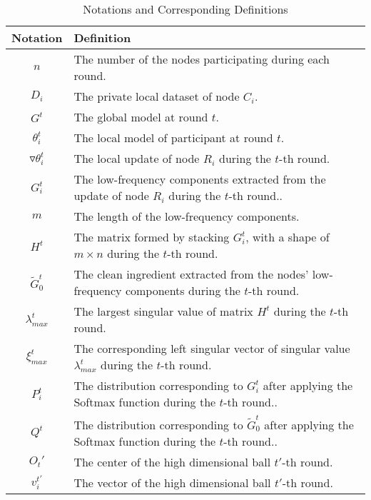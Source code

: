 \documentclass[lettersize,journal]{IEEEtran}
\begin{document}
\begin{table*}[h]
\centering
\caption{Notations and Corresponding Definitions}
\label{tabl:notations}
\begin{tabular}{|c|l|}
\hline
\textbf{Notation} & \textbf{Definition} \\ \hline
$ n $ & The number of the nodes participating during each round. \\ \hline
$D_i$ & The private local dataset of node $C_i$. \\ \hline

$G^t$ & The global model at round $t$. \\ \hline
$\theta_i^t$ & The local model of participant at round $t$. \\ \hline
$\triangledown \theta_i^t$ & The local update of node $R_i$ during the $t$-th round. \\ \hline
$G_i^t $ & The low-frequency components extracted from the update of node $R_i$ during the $t$-th round.. \\ \hline
$m$ & The length of the low-frequency components. \\ \hline
$H^t$ & The matrix formed by stacking $G_i^t$, with a shape of $m \times n$ during the $t$-th round. \\ \hline
$\tilde{G}_{0}^t $ & The clean ingredient extracted from the nodes' low-frequency components during the $t$-th round. \\ \hline
$\lambda_{max}^t$ & The largest singular value of matrix $H^t$ during the $t$-th round. \\ \hline
$\xi_{max}^t$ & The corresponding left singular vector of singular value $\lambda_{max}^t$ during the $t$-th round. \\ \hline
$P_i^t$ & The distribution corresponding to $G_i^t$ after applying the Softmax function during the $t$-th round.. \\ \hline
$Q^t$ &  The distribution corresponding to $\tilde{G}_{0}^t$ after applying the Softmax function during the $t$-th round.. \\ \hline
$O_t'$ &  The center of the high dimensional ball $t'$-th round. \\ \hline
\( {v}_{i}^{t'} \) & The vector of the high dimensional ball $t'$-th round.\\ \hline


\end{tabular}
\end{table*}
\end{document}
